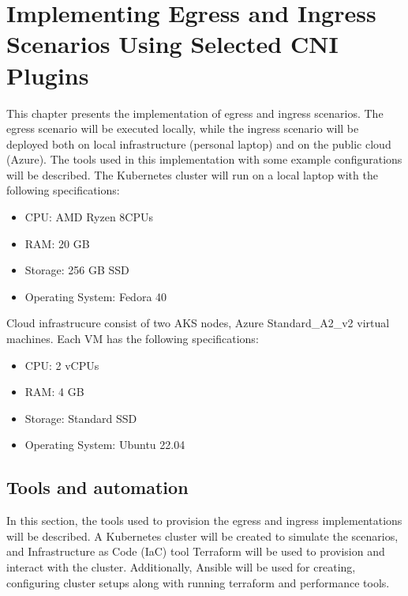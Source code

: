 \chapter{Implementing Egress and Ingress Scenarios Using Selected CNI Plugins}
\label{cha:practical_impl}

This chapter presents the implementation of egress and ingress scenarios. The egress scenario will be executed locally, while the ingress scenario will be deployed both on local infrastructure (personal laptop) and on the public cloud (Azure). The tools used in this implementation with some example configurations will be described.
The Kubernetes cluster will run on a local laptop with the following specifications:
\begin{itemize}
  \item CPU: AMD Ryzen 8CPUs
  \item RAM: 20 GB
  \item Storage: 256 GB SSD
  \item Operating System: Fedora 40
\end{itemize}

Cloud infrastrucure consist of two AKS nodes, Azure Standard\_A2\_v2 virtual machines. Each VM has the following specifications:
\begin{itemize}
  \item CPU: 2 vCPUs
  \item RAM: 4 GB
  \item Storage: Standard SSD
  \item Operating System: Ubuntu 22.04
\end{itemize}






\section{Tools and automation}
\label{sec:tools}

In this section, the tools used to provision the egress and ingress implementations will be described. A Kubernetes cluster will be created to simulate the scenarios, and Infrastructure as Code (IaC) tool Terraform will be used to provision and interact with the cluster. Additionally, Ansible will be used for creating, configuring cluster setups along with running terraform and performance tools.



